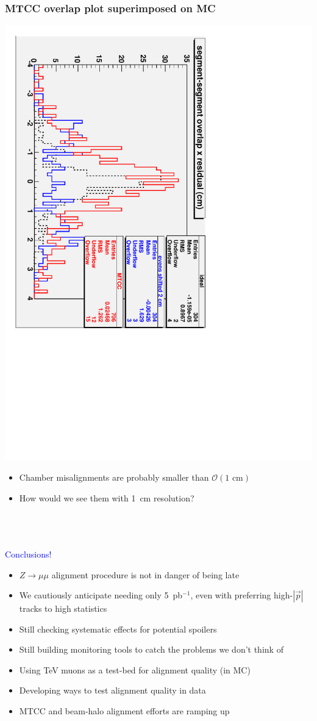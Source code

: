 \documentclass[compress]{beamer}
\begin{document}
\begin{frame}
\frametitle{MTCC overlap plot superimposed on MC}
\begin{center}
\includegraphics[height=0.8\linewidth, angle=90]{overlap_residual.pdf}
\end{center}
\begin{itemize}
\item Chamber misalignments are probably smaller than $\mathcal{O}(\mbox{1 cm})$
\item How would we see them with 1~cm resolution?
\end{itemize}
\end{frame}

\section*{}

\begin{frame}
\begin{center}
\mbox{ }

\vspace{-1 cm}
\Huge \textcolor{blue}{Conclusions!}
\end{center}
\begin{itemize}\setlength{\itemsep}{0.3 cm}
\item $Z\to\mu\mu$ alignment procedure is not in danger of being late
\item We cautiously anticipate needing only 5~pb$^{-1}$, even with preferring high-$|\vec{p}|$ tracks to high statistics
\item Still checking systematic effects for potential spoilers
\item Still building monitoring tools to catch the problems we don't think of
\item Using TeV muons as a test-bed for alignment quality (in MC)
\item Developing ways to test alignment quality in data
\item MTCC and beam-halo alignment efforts are ramping up
\end{itemize}
\vfill
\mbox{ }
\label{numpages}
\end{frame}
\end{document}
